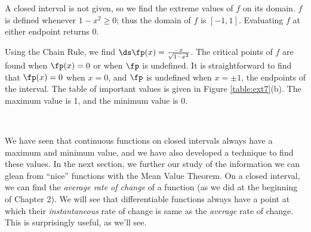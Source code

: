 {A closed interval is not given, so we find the extreme values of $f$ on its domain. $f$ is defined whenever $1-x^2\geq 0$; thus the domain of $f$ is $[-1,1]$. Evaluating $f$ at either endpoint returns 0. 

Using the Chain Rule, we find $\ds \fp(x) = \frac{-x}{\sqrt{1-x^2}}$. The critical points of $f$ are found when $\fp(x) = 0$ or when $\fp$ is undefined. It is straightforward to find that $\fp(x) = 0$ when $x=0$, and $\fp$ is undefined when $x=\pm 1$, the endpoints of the interval. The table of important values is given in Figure \ref{table:ext7}(b). The maximum value is 1, and the minimum value is 0.
}\\



\enlargethispage{2\baselineskip}
We have seen that continuous functions on closed intervals always have a maximum and minimum value, and we have also developed a technique to find these values. In the next section, we further our study of the information we can glean from ``nice'' functions with the Mean Value Theorem. On a closed interval, we can find the \textit{average rate of change} of a function (as we did at the beginning of Chapter 2). We will see that differentiable functions always have a point at which their \textit{instantaneous} rate of change is same as the \textit{average} rate of change. This is surprisingly useful, as we'll see.






